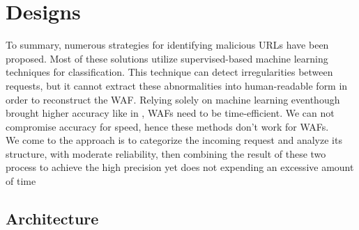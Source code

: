 \section{Designs}
\label{design}
To summary, numerous strategies for identifying malicious URLs have been proposed. Most of these solutions utilize supervised-based machine learning techniques for classification. This technique can detect irregularities between requests, but it cannot extract these abnormalities into human-readable form in order to reconstruct the WAF. Relying solely on machine learning eventhough brought higher accuracy like in \cite{s22093373}, WAFs need to be time-efficient. We can not compromise accuracy for speed, hence these methods don't work for WAFs.\\
We come to the approach is to categorize the incoming request and analyze its structure, with moderate reliability, then combining the result of these two process to achieve the high precision yet does not expending an excessive amount of time
\subsection{Architecture}
\label{architecture design}
